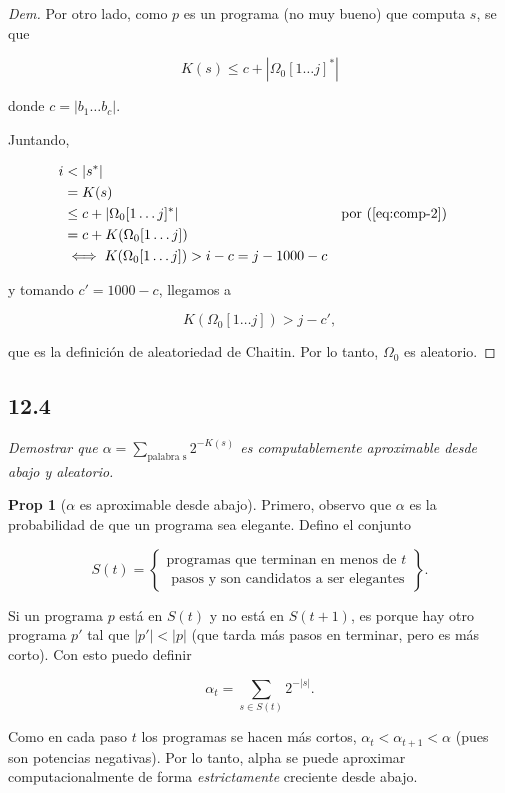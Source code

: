 \documentclass{article}
\theoremstyle{definition} %
\newtheorem*{proposition*}{Prop}
\newcommand{\first}[2]{#2[1 \dots #1]}
\begin{document}
\begin{proof}[Dem]
    Por otro lado, como $p$ es un programa (no muy bueno) que computa $s$, se que

    \begin{equation}\label{eq:comp-2}
         K(s) \leq c + |\first{j}{\Omega_0}^*|
    \end{equation}

    donde $c = |b_1 \dots b_c|$.

    Juntando,

    \begin{align*}
        i
            &< |s^*|\\
            &= K(s)\\
            &\leq c + |\first{j}{\Omega_0}^*|
                &&\text{por (\ref{eq:comp-2})} \\
            &= c + K(\first{j}{\Omega_0}) \\
            &\iff K(\first{j}{\Omega_0}) > i - c = j - 1000 - c
    \end{align*}

     y tomando $c' = 1000 -
c$, llegamos a

    \[
        K(\first{j}{\Omega_0}) > j - c',
    \]
    
    que es la definición de aleatoriedad de Chaitin. Por lo tanto, $\Omega_0$
    es aleatorio.

\end{proof}

\newpage
\subsection*{12.4}

\textit{Demostrar que $\alpha = \sum_{\text{palabra s}} 2^{-K(s)}$ es
computablemente aproximable desde abajo y aleatorio.}

\begin{proposition*}[$\alpha$ es aproximable desde abajo]
    Primero, observo que $\alpha$ es la probabilidad de que un programa sea
    elegante. Defino el conjunto

    \[
        S(t) = \left\{
            \begin{gathered}
            \text{programas que terminan en menos de } t \\
            \text{ pasos y son candidatos a ser elegantes}
            \end{gathered}
        \right\}.
    \]

    Si un programa $p$ está en $S(t)$ y no está en $S(t + 1)$, es porque hay
    otro programa $p'$ tal que $|p'| < |p|$ (que tarda más pasos en terminar,
    pero es más corto). Con esto puedo definir

    \[
        \alpha_t = \sum_{s \in S(t)} 2^{-|s|}.
    \]

    Como en cada paso $t$ los programas se hacen más cortos, $\alpha_t <
    \alpha_{t+1} < \alpha$ (pues son potencias negativas). Por lo tanto, alpha
    se puede aproximar computacionalmente de forma \textit{estrictamente}
    creciente desde abajo.
\end{proposition*}
\end{document}
